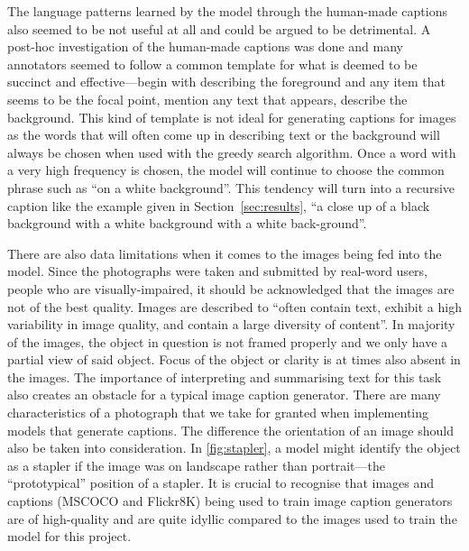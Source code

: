 \documentclass[11pt,a4paper]{article}
\newcommand{\Secref}[1]{Section~\ref{#1}}
\begin{document}
The language patterns learned by the model through the human-made captions also seemed to be not useful at all and could be argued to be detrimental. A post-hoc investigation of the human-made captions was done and many annotators seemed to follow a common template for what is deemed to be succinct and effective—begin with describing the foreground and any item that seems to be the focal point, mention any text that appears, describe the background. This kind of template is not ideal for generating captions for images as the words that will often come up in describing text or the background will always be chosen when used with the greedy search algorithm. Once a word with a very high frequency is chosen, the model will continue to choose the common phrase such as “on a white background”. This tendency will turn into a recursive caption like the example given in \Secref{sec:results}, “a close up of a black background with a white background with a white back-ground”. 

There are also data limitations when it comes to the images being fed into the model. Since the photographs were taken and submitted by real-word users, people who are visually-impaired, it should be acknowledged that the images are not of the best quality. Images are described to “often contain text, exhibit a high variability in image quality, and contain a large diversity of content”. \citep{Gurari-2020-captioning} In majority of the images, the object in question is not framed properly and we only have a partial view of said object. Focus of the object or clarity is at times also absent in the images. The importance of interpreting and summarising text for this task also creates an obstacle for a typical image caption generator. There are many characteristics of a photograph that we take for granted when implementing models that generate captions. The difference the orientation of an image should also be taken into consideration. In \autoref{fig:stapler}, a model might identify the object as a stapler if the image was on landscape rather than portrait—the “prototypical” position of a stapler. It is crucial to recognise that images and captions (MSCOCO and Flickr8K) being used to train image caption generators are of high-quality and are quite idyllic compared to the images used to train the model for this project. 
\end{document}
